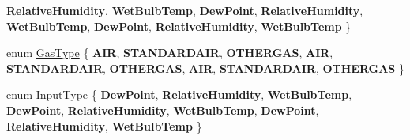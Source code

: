 \begin{DoxyCompactItemize}
{\bfseries Relative\+Humidity}, 
{\bfseries Wet\+Bulb\+Temp}, 
{\bfseries Dew\+Point}, 
\newline
{\bfseries Relative\+Humidity}, 
{\bfseries Wet\+Bulb\+Temp}, 
{\bfseries Dew\+Point}, 
{\bfseries Relative\+Humidity}, 
\newline
{\bfseries Wet\+Bulb\+Temp}
 \}
\item 
enum \hyperlink{class_base_gas_density_afb215e48f6193462521b7e8d47306ed3}{Gas\+Type} \{ \newline
{\bfseries A\+IR}, 
{\bfseries S\+T\+A\+N\+D\+A\+R\+D\+A\+IR}, 
{\bfseries O\+T\+H\+E\+R\+G\+AS}, 
{\bfseries A\+IR}, 
\newline
{\bfseries S\+T\+A\+N\+D\+A\+R\+D\+A\+IR}, 
{\bfseries O\+T\+H\+E\+R\+G\+AS}, 
{\bfseries A\+IR}, 
{\bfseries S\+T\+A\+N\+D\+A\+R\+D\+A\+IR}, 
\newline
{\bfseries O\+T\+H\+E\+R\+G\+AS}
 \}
\item 
enum \hyperlink{class_base_gas_density_a54f846cc4683a49d3904a40fe2986772}{Input\+Type} \{ \newline
{\bfseries Dew\+Point}, 
{\bfseries Relative\+Humidity}, 
{\bfseries Wet\+Bulb\+Temp}, 
{\bfseries Dew\+Point}, 
\newline
{\bfseries Relative\+Humidity}, 
{\bfseries Wet\+Bulb\+Temp}, 
{\bfseries Dew\+Point}, 
{\bfseries Relative\+Humidity}, 
\newline
{\bfseries Wet\+Bulb\+Temp}
 \}
\end{DoxyCompactItemize}
